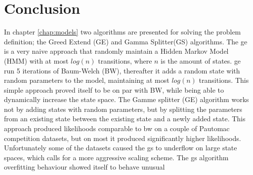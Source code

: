 \chapter{Conclusion}
\label{chap:conclusion}
In chapter \ref{chap:models} two algorithms are presented for solving the problem definition; the Greed Extend (GE) and Gamma Splitter(GS) algorithms. The \gls{ge} is a very naive approach that randomly maintain a Hidden Markov Model (HMM) with at most $log(n)$ transitions, where $n$ is the amount of states. \gls{ge} run 5 iterations of Baum-Welch (BW), thereafter it adds a random state with random parameters to the model, maintaining at most $log(n)$ transitions. This simple approach proved itself to be on par with BW, while being able to dynamically increase the state space. The Gamme splitter (GE) algorithm works not by adding states with random parameters, but by splitting the parameters from an existing state between the existing state and a newly added state. This approach produced likelihoods comparable to \gls{bw} on a couple of Pautomac competition datasets, but on most it produced significantly higher likelihoods. Unfortunately some of the datasets caused the \gls{gs} to underflow on large state spaces, which calls for a more aggressive scaling scheme.
The \gls{gs} algorithm overfitting behaviour showed itself to behave unusual
